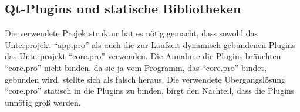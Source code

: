 \subsection{Qt-Plugins und statische Bibliotheken}
Die verwendete Projektstruktur hat es nötig gemacht, dass sowohl das Unterprojekt \enquote{app.pro} als auch die zur Laufzeit dynamisch gebundenen Plugins das Unterprojekt \enquote{core.pro} verwenden.
Die Annahme die Plugins bräuchten \enquote{core.pro} nicht binden, da sie ja vom Programm, das \enquote{core.pro} bindet, gebunden wird, stellte sich als falsch heraus.
Die verwendete Übergangslösung \enquote{core.pro} statisch in die Plugins zu binden, birgt den Nachteil, dass die Plugins unnötig groß werden.
